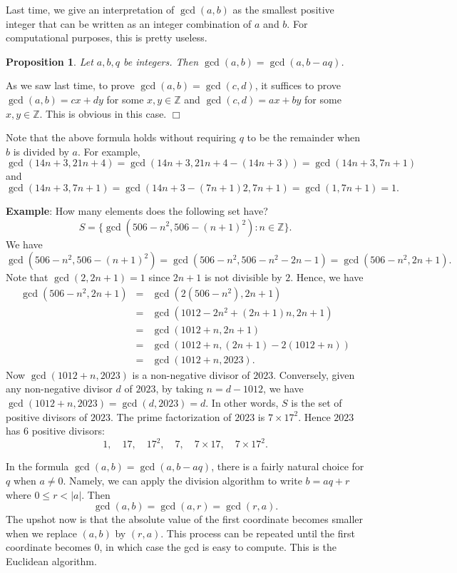 \documentclass{article}
\def\Z{{\mathbb Z}}
\def\Z{{\mathbb Z}}
\newtheorem{proposition}[subsection]{Proposition}
\newenvironment{proof}{\noindent {\bf Proof:}}{$\Box$ \vspace{2 ex}}
\begin{document}
Last time, we give an interpretation of $\gcd(a,b)$ as the smallest positive integer that can be written as an integer combination of $a$ and $b$. For computational purposes, this is pretty useless.

\begin{proposition}
    Let $a,b,q$ be integers. Then $\gcd(a, b) = \gcd(a, b - aq)$.
\end{proposition}

\begin{proof}
    As we saw last time, to prove $\gcd(a,b) = \gcd(c,d)$, it suffices to prove $\gcd(a,b)=cx + dy$ for some $x,y\in\Z$ and $\gcd(c,d) = ax + by$ for some $x,y\in\Z$. This is obvious in this case.
\end{proof}



\vspace{5pt}
Note that the above formula holds without requiring $q$ to be the remainder when $b$ is divided by $a$. For example,
$$\gcd(14n+3, 21n+4) = \gcd(14n+3, 21n+4 - (14n+3)) = \gcd(14n+3, 7n+1)$$
and $$\gcd(14n+3, 7n+1) = \gcd(14n+3-(7n+1)2,7n+1) = \gcd(1, 7n+1) = 1.$$

\noindent\textbf{Example}: How many elements does the following set have? $$S = \{\gcd(506-n^2, 506-(n+1)^2)\colon n\in\Z\}.$$
We have
$$\gcd(506-n^2, 506-(n+1)^2) = \gcd(506-n^2, 506-n^2-2n-1) = \gcd(506-n^2, 2n+1).$$
Note that $\gcd(2, 2n+1) = 1$ since $2n+1$ is not divisible by $2$. Hence, we have
\begin{eqnarray*}
    \gcd(506-n^2, 2n+1) &=& \gcd(2(506-n^2),2n+1)\\ &=& \gcd(1012-2n^2+(2n+1)n,2n+1)\\
    &=&\gcd(1012+n, 2n+1)\\
    &=&\gcd(1012+n, (2n+1)-2(1012+n))\\
    &=&\gcd(1012+n, 2023).
\end{eqnarray*}
Now $\gcd(1012+n, 2023)$ is a non-negative divisor of $2023$. Conversely, given any non-negative divisor $d$ of $2023$, by taking $n = d-1012$, we have $\gcd(1012+n,2023) = \gcd(d,2023) = d$. In other words, $S$ is the set of positive divisors of $2023$. The prime factorization of $2023$ is $7\times 17^2$. Hence $2023$ has $6$ positive divisors:
$$1,\quad 17,\quad 17^2,\quad 7,\quad 7\times17,\quad 7\times17^2.$$

In the formula $\gcd(a,b) = \gcd(a, b - aq)$, there is a fairly natural choice for $q$ when $a\neq 0$. Namely, we can apply the division algorithm to write $b = aq + r$ where $0\leq r < |a|$. Then $$\gcd(a,b) = \gcd(a, r) = \gcd(r, a).$$
The upshot now is that the absolute value of the first coordinate becomes smaller when we replace $(a,b)$ by $(r,a)$. This process can be repeated until the first coordinate becomes $0$, in which case the gcd is easy to compute. This is the Euclidean algorithm.
\end{document}
